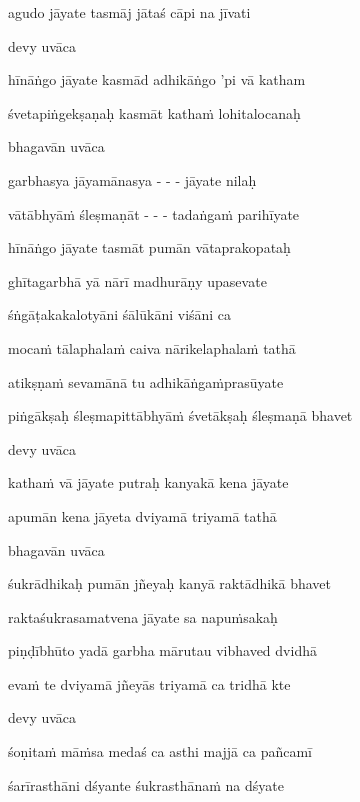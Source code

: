 agudo jāyate tasmāj jātaś cāpi na jīvati \veg\dontdisplaylinenum

devy uvāca~{\dandab}\dontdisplaylinenum 

hīnāṅgo jāyate kasmād adhikāṅgo 'pi vā katham\thinspace{\danda} \dontdisplaylinenum

śvetapiṅgekṣaṇaḥ kasmāt katha\.m lohitalocanaḥ \veg\dontdisplaylinenum

bhagavān uvāca~{\dandab}\dontdisplaylinenum 

garbhasya jāyamānasya - - -  jāyate nilaḥ\thinspace{\danda} \dontdisplaylinenum

vātābhyā\.m śleṣmaṇāt - - - tadaṅga\.m parihīyate \veg\dontdisplaylinenum

hīnāṅgo jāyate tasmāt pumān vātaprakopataḥ\thinspace{\dandab} \dontdisplaylinenum

ghītagarbhā yā nārī madhurāṇy upasevate \veg\dontdisplaylinenum

śṅgāṭakakalotyāni śālūkāni viśāni ca\thinspace{\dandab} \dontdisplaylinenum

moca\.m tālaphala\.m caiva nārikelaphala\.m tathā \veg\dontdisplaylinenum

atikṣṇa\.m sevamānā tu adhikāṅga\.mprasūyate\thinspace{\dandab} \dontdisplaylinenum

piṅgākṣaḥ śleṣmapittābhyā\.m śvetākṣaḥ śleṣmaṇā bhavet \veg\dontdisplaylinenum

devy uvāca~{\dandab}\dontdisplaylinenum 

katha\.m vā jāyate putraḥ kanyakā kena jāyate\thinspace{\danda} \dontdisplaylinenum

apumān kena jāyeta dviyamā triyamā tathā \veg\dontdisplaylinenum

bhagavān uvāca~{\dandab}\dontdisplaylinenum 

śukrādhikaḥ pumān jñeyaḥ kanyā raktādhikā bhavet\thinspace{\danda} \dontdisplaylinenum

raktaśukrasamatvena jāyate sa napu\.msakaḥ \veg\dontdisplaylinenum

piṇḍībhūto yadā garbha mārutau vibhaved dvidhā\thinspace{\dandab} \dontdisplaylinenum

eva\.m te dviyamā jñeyās triyamā ca tridhā kte \veg\dontdisplaylinenum

devy uvāca~{\dandab}\dontdisplaylinenum 

śoṇita\.m mā\.msa medaś ca asthi majjā ca pañcamī\thinspace{\danda} \dontdisplaylinenum

śarīrasthāni dśyante śukrasthāna\.m na dśyate \veg\dontdisplaylinenum

